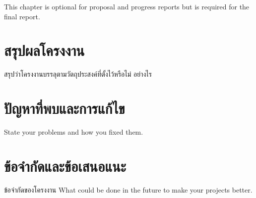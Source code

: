 \documentclass[12pt,oneside,openright,a4paper]{cpe-thai-project}
\begin{document}
This chapter is optional for proposal and progress reports but 
is required for the final report.

\section{สรุปผลโครงงาน}
สรุปว่าโครงงานบรรลุตามวัตถุประสงค์ที่ตั้งไว้หรือไม่ อย่างไร 

\section{ปัญหาที่พบและการแก้ไข}
State your problems and how you fixed them.

\section{ข้อจำกัดและข้อเสนอแนะ}
ข้อจำกัดของโครงงาน What could be done in the future to make your projects better.



\makeatletter
\g@addto@macro{\UrlBreaks}{\UrlOrds}
\makeatother




 \\
\end{document}
